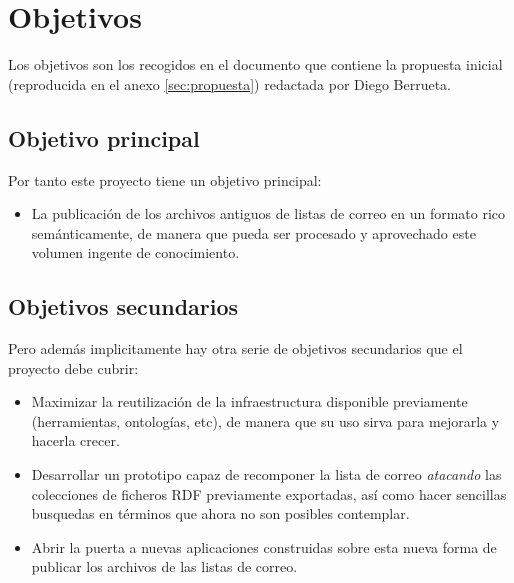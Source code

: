 
\section{Objetivos}

Los objetivos son los recogidos en el documento que contiene la propuesta 
inicial (reproducida en el anexo \ref{sec:propuesta}) redactada por Diego 
Berrueta.

\subsection{Objetivo principal}

Por tanto este proyecto tiene un objetivo principal:

\begin{itemize}
  \item La publicación de los archivos antiguos de listas de correo en un 
	formato rico semánticamente, de manera que pueda ser procesado y
	aprovechado este volumen ingente de conocimiento.
\end{itemize}

\subsection{Objetivos secundarios}

Pero además implicitamente hay otra serie de objetivos secundarios que el
proyecto debe cubrir:

\begin{itemize}
  \item Maximizar la reutilización de la infraestructura disponible previamente
	(herramientas, ontologías, etc), de manera que su uso sirva para mejorarla
	y hacerla crecer.
  \item Desarrollar un prototipo capaz de recomponer la lista de correo 
	\emph{atacando} las colecciones de ficheros RDF previamente exportadas,
	así como hacer sencillas busquedas en términos que ahora no son
	posibles contemplar.
  \item Abrir la puerta a nuevas aplicaciones construidas sobre esta nueva forma
	de publicar los archivos de las listas de correo.
\end{itemize}

